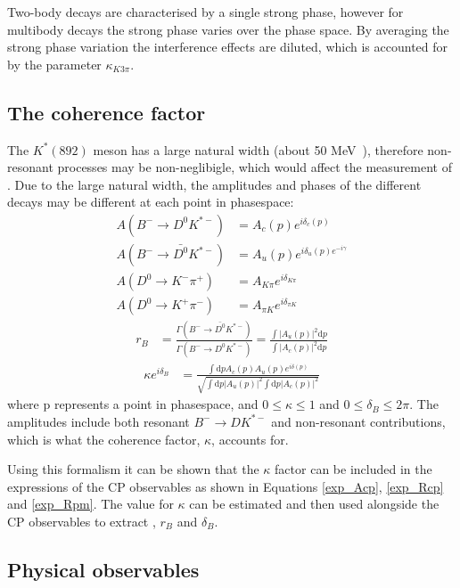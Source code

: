 Two-body \decay{\D}{\Kmp\pipm} decays are characterised by a single strong phase, however for multibody \decay{\D}{\Kmp\pipm\pimp\pipm} decays the strong phase varies over the phase space. By averaging the strong phase variation the interference effects are diluted, which is accounted for by the parameter $\kappa_{K3\pi}$.

\subsection{The coherence factor}

The $K^*(892)$ meson has a large natural width (about 50 MeV~\cite{PDG2016}), therefore non-resonant \decay{\Bm}{\D\KS\pim} processes may be non-neglibigle, which would affect the measurement of \Pgamma. Due to the large natural width, the amplitudes and phases of the different decays may be different at each point in phasespace:
\begin{align*}
A(B^- \to D^0 K^{*-}) &= A_c(p) e^{i\delta_c(p)} \\
A(B^- \to \bar{D^0} K^{*-}) &= A_u(p) e^{i\delta_u(p) e^{-i\gamma}} \\
A(D^0 \to K^-\pi^+) &= A_{K\pi} e^{i\delta_{K\pi}} \\
A(D^0 \to K^+\pi^-) &= A_{{\pi}K} e^{i\delta_{{\pi}K}} 
\end{align*}
\begin{align*}
r_B &= \frac{\Gamma(B^- \to \bar{D^0}K^{*-})}{\Gamma(B^- \to D^0K^{*-})} = \frac{\int \left|A_u(p)\right|^2 \mathrm{d}p}{\int \left|A_c(p)\right|^2 \mathrm{d}p}
\end{align*}
\begin{align}
\kappa e^{i\delta_B} &= \frac{\int \mathrm{d}p A_c(p)A_u(p)e^{i\delta(p)}}{\sqrt{\int \mathrm{d}p \left|A_u(p)\right|^2 \int \mathrm{d}p \left|A_c(p)\right|^2}}
\label{kappadefinition}
\end{align}
where p represents a point in phasespace, and $0 \leq \kappa \leq 1$ and $0 \leq \delta_B \leq 2\pi$. The amplitudes include both resonant $B^- \to DK^{*-}$ and non-resonant contributions, which is what the coherence factor, $\kappa$, accounts for.

Using this formalism it can be shown that the $\kappa$ factor can be included in the expressions of the CP observables as shown in Equations \ref{exp_Acp}, \ref{exp_Rcp} and \ref{exp_Rpm}. The value for $\kappa$ can be estimated and then used alongside the CP observables to extract \Pgamma, $r_B$ and $\delta_B$.

\subsection{Physical observables}

